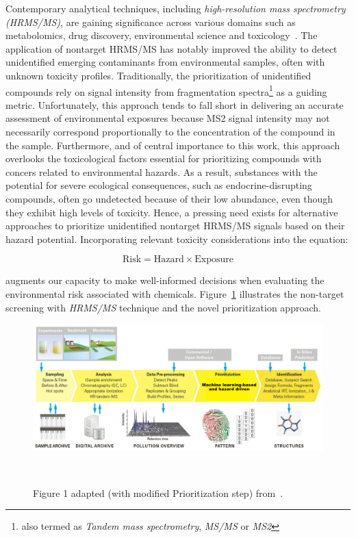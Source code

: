 Contemporary analytical techniques, including \emph{high-resolution mass spectrometry (HRMS/MS)}, are gaining significance across various domains such as metabolomics, drug discovery, environmental science and toxicology~\cite{tamara2022}. The application of nontarget HRMS/MS has notably improved the ability to detect unidentified emerging contaminants from environmental samples, often with unknown toxicity profiles. Traditionally, the prioritization of unidentified compounds rely on signal intensity from fragmentation spectra\footnote{also termed as \emph{Tandem mass spectrometry}, \emph{MS/MS} or \emph{MS2}} as a guiding metric. Unfortunately, this approach tends to fall short in delivering an accurate assessment of environmental exposures because MS2 signal intensity may not necessarily correspond proportionally to the concentration of the compound in the sample. Furthermore, and of central importance to this work, this approach overlooks the toxicological factors essential for prioritizing compounds with concers related to environmental hazards. As a result, substances with the potential for severe ecological consequences, such as endocrine-disrupting compounds, often go undetected because of their low abundance, even though they exhibit high levels of toxicity. Hence, a pressing need exists for alternative approaches to prioritize unidentified nontarget HRMS/MS signals based on their hazard potential. Incorporating relevant toxicity considerations into the equation:

\begin{equation}
    \text{Risk} = \text{Hazard} \times \text{Exposure}
\end{equation}

augments our capacity to make well-informed decisions when evaluating the environmental risk associated with chemicals.
Figure~\ref{fig:non_target_high_resolution_mass_spectrometry} illustrates the non-target screening with \emph{HRMS/MS} technique and the novel prioritization \emph{} approach.
 
 \begin{figure}[htbp]  %
     \centering
     \includegraphics[width=1.0\textwidth]{figures/non_target_high_resolution_mass_spectrometry_1.png}  
     \caption{Figure 1 adapted (with modified Prioritization step) from~\cite{hollender}.}
 ~\label{fig:non_target_high_resolution_mass_spectrometry} 
 \end{figure}

